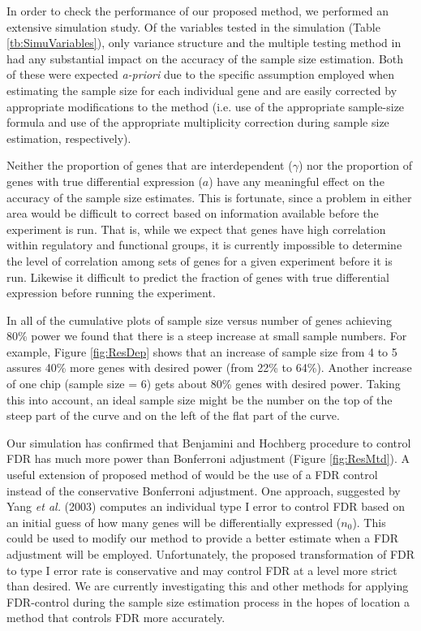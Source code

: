 \documentclass{bioinfo}
\begin{document}
In order to check the performance of our proposed method, we
performed an extensive simulation study. Of the variables tested in
the simulation (Table \ref{tb:SimuVariables}), only variance
structure and the multiple testing method in had any substantial
impact on the accuracy of the sample size estimation.  Both of these
were expected \textit{a-priori }due to the specific assumption
employed when estimating the sample size for each individual gene
and are easily corrected by appropriate modifications to the method
(i.e. use of the appropriate sample-size formula and use of the
appropriate multiplicity correction during sample size estimation,
respectively).

Neither the proportion of genes that are interdependent ($\gamma$)
nor the proportion of genes with true differential expression ($a$)
have any meaningful effect on the accuracy of the sample size
estimates.  This is fortunate, since a problem in either area would
be difficult to correct based on information available before the
experiment is run.  That is, while we expect that genes have high
correlation within regulatory and functional groups, it is currently
impossible to determine the level of correlation among sets of genes
for a given experiment before it is run.  Likewise it difficult to
predict the fraction of genes with true differential expression
before running the experiment.

In all of the cumulative plots of sample size versus number of
genes achieving 80\% power we found that there is a steep increase
at small sample numbers. For example, Figure \ref{fig:ResDep}
shows that an increase of sample size from 4 to 5 assures 40\%
more genes with desired power (from 22\% to 64\%).  Another
increase of one chip (sample size = 6) gets about 80\% genes with
desired power. Taking this into account, an ideal sample size
might be the number on the top of the steep part of the curve and
on the left of the flat part of the curve.

Our simulation has confirmed that Benjamini and Hochberg procedure to
control FDR has much more power than Bonferroni adjustment (Figure
\ref{fig:ResMtd}). A useful extension of proposed method of would be
the use of a FDR control instead of the conservative Bonferroni
adjustment. One approach, suggested by Yang \textit{et al.} (2003)
computes an individual type I error to control FDR based on an
initial guess of how many genes will be differentially expressed
($n_0$). This could be used to modify our method to provide a better
estimate when a FDR adjustment will be employed.  Unfortunately, the
proposed transformation of FDR to type I error rate is conservative
and may control FDR at a level more strict than desired. We are
currently investigating this and other methods for applying
FDR-control during the sample size estimation process in the hopes
of location a method that controls FDR more accurately.
\end{document}
